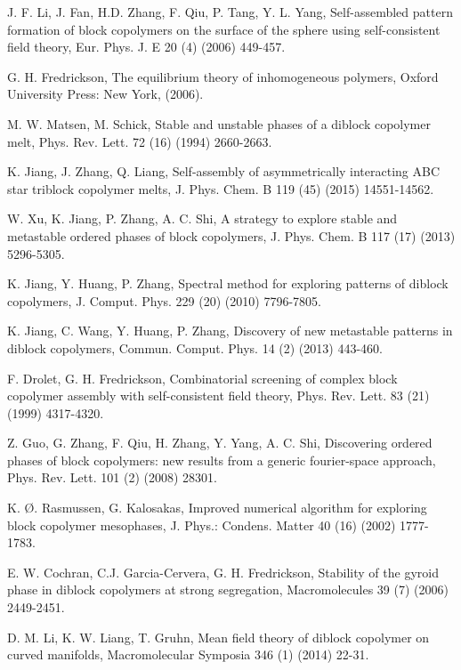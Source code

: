\documentclass[final,1p,times]{elsarticle}
\begin{document}
\begin{thebibliography}{100}
J. F. Li, J. Fan, H.D. Zhang, F. Qiu, P. Tang, Y. L. Yang,
Self-assembled pattern formation of block copolymers on the
surface of the sphere using self-consistent field theory,
{Eur. Phys. J. E} 20 (4) (2006) 449-457.

G. H. Fredrickson,
{The equilibrium theory of inhomogeneous polymers},
Oxford University Press: New York, (2006).

M. W. Matsen, M. Schick,
Stable and unstable phases of a diblock copolymer melt,
{Phys. Rev. Lett.}
72 (16) (1994) 2660-2663.


K. Jiang, J. Zhang, Q. Liang,
Self-assembly of asymmetrically interacting ABC star triblock copolymer melts,
{J. Phys. Chem. B} 119 (45) (2015) 14551-14562.

W. Xu, K. Jiang, P. Zhang, A. C. Shi,
A strategy to explore stable and metastable ordered phases of block copolymers,
{J. Phys. Chem. B} 117 (17) (2013) 5296-5305.

K. Jiang, Y. Huang, P. Zhang,
Spectral method for exploring patterns of diblock copolymers,
{J. Comput. Phys.} 229 (20) (2010) 7796-7805.

K. Jiang, C. Wang, Y. Huang, P. Zhang,
Discovery of new metastable patterns in diblock copolymers,
{Commun. Comput. Phys.} 14 (2) (2013) 443-460.

F. Drolet, G. H. Fredrickson,
Combinatorial screening of complex block copolymer assembly
with self-consistent field theory, 
{Phys. Rev. Lett.}
83 (21) (1999) 4317-4320.

Z. Guo, G. Zhang, F. Qiu, H. Zhang, Y. Yang, A. C. Shi,
Discovering ordered phases of block copolymers:
new results from a generic fourier-space approach,
{Phys. Rev. Lett.}
101 (2) (2008) 28301.


K. {\O}. Rasmussen, G. Kalosakas,
Improved numerical algorithm for exploring block copolymer mesophases,
{J. Phys.: Condens. Matter}
40 (16) (2002) 1777-1783.

E. W. Cochran, C.J. Garcia-Cervera, G. H. Fredrickson,
Stability of the gyroid phase in diblock copolymers at strong segregation,
{Macromolecules} 39 (7) (2006) 2449-2451.

D. M. Li, K. W. Liang, T. Gruhn,
{Mean field theory of diblock copolymer on curved manifolds}, 
{Macromolecular Symposia} 346 (1) (2014) 22-31.


\end{thebibliography}
\end{document}
